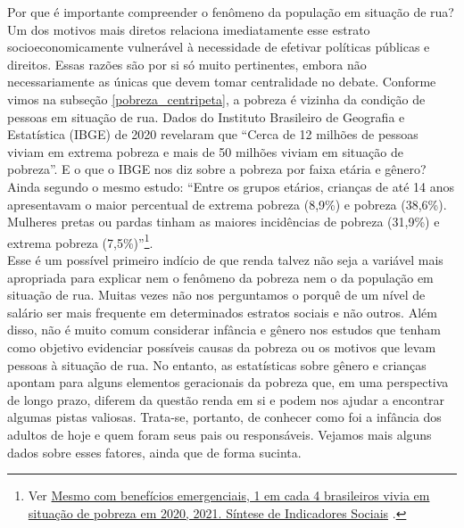 \documentclass[14pt]{extarticle}
\begin{document}
Por que é importante compreender o fenômeno da população em situação de rua? Um dos motivos mais diretos relaciona imediatamente esse estrato socioeconomicamente vulnerável à necessidade de efetivar políticas públicas e direitos. Essas razões são por si só muito pertinentes, embora não necessariamente as únicas que devem tomar centralidade no debate. Conforme vimos na subseção \ref{pobreza_centripeta}, a pobreza é vizinha da condição de pessoas em situação de rua. Dados do Instituto Brasileiro de Geografia e Estatística (IBGE) de 2020 revelaram que ``Cerca de 12 milhões de pessoas viviam em extrema pobreza e mais de 50 milhões viviam em situação de pobreza”. E o que o IBGE nos diz sobre a pobreza por faixa etária e gênero? Ainda segundo o mesmo estudo: ``Entre os grupos etários, crianças de até 14 anos apresentavam o maior percentual de extrema pobreza (8,9\%) e pobreza (38,6\%). Mulheres pretas ou pardas tinham as maiores incidências de pobreza (31,9\%) e extrema pobreza (7,5\%)”\footnote{Ver \href{https://agenciadenoticias.ibge.gov.br/agencia-noticias/2012-agencia-de-noticias/noticias/32420-mesmo-com-beneficios-emergenciais-1-em-cada-4-brasileiros-vivia-em-situacao-de-pobreza-em-2020}{Mesmo com benefícios emergenciais, 1 em cada 4 brasileiros vivia em situação de pobreza em 2020, 2021. Síntese de Indicadores Sociais} \citep{ibge2}.}.\\

Esse é um possível primeiro indício de que renda talvez não seja a variável mais apropriada para explicar nem o fenômeno da pobreza nem o da população em situação de rua. Muitas vezes não nos perguntamos o porquê de um nível de salário ser mais frequente em determinados estratos sociais e não outros. Além disso, não é muito comum considerar infância e gênero nos estudos que tenham como objetivo evidenciar possíveis causas da pobreza ou os motivos que levam pessoas à situação de rua. No entanto, as estatísticas sobre gênero e crianças apontam para alguns elementos geracionais da pobreza que, em uma perspectiva de longo prazo, diferem da questão renda em si e podem nos ajudar a encontrar algumas pistas valiosas. Trata-se, portanto, de conhecer como foi a infância dos adultos de hoje e quem foram seus pais ou responsáveis. Vejamos mais alguns dados sobre esses fatores, ainda que de forma sucinta.\\ 
\end{document}
